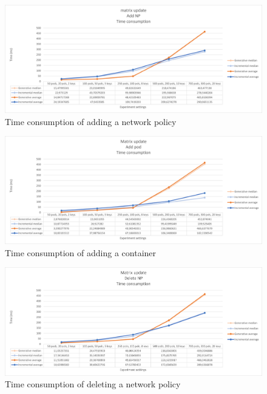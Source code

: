\begin{figure}[H]
    \centering
    \includegraphics[width=\textwidth]{images/experiment1/addNP-time.png}
    \caption{Time consumption of adding a network policy}
    \label{fig:exp1-addNP-time}
\end{figure}
\begin{figure}[H]
    \centering
    \includegraphics[width=\textwidth]{images/experiment1/addPod-time.png}
    \caption{Time consumption of adding a container}
    \label{fig:exp1-addPod-time}
\end{figure}
\begin{figure}[H]
    \centering
    \includegraphics[width=\textwidth]{images/experiment1/delNP-time.png}
    \caption{Time consumption of deleting a network policy}
    \label{fig:exp1-delNP-time}
\end{figure}
